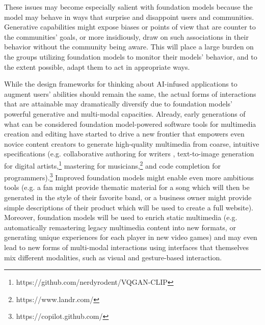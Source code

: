 These issues may become especially salient with foundation models because the model may behave in ways that surprise and disappoint users and communities. Generative capabilities might expose biases or points of view that are counter to the communities' goals, or more insidiously, draw on such associations in their behavior without the community being aware. This will place a large burden on the groups utilizing foundation models to monitor their models' behavior, and to the extent possible, adapt them to act in appropriate ways.

While the design frameworks for thinking about AI-infused applications to augment users' abilities should remain the same, the actual forms of interactions that are attainable may dramatically diversify due to foundation models' powerful generative and multi-modal capacities. Already, early generations of what can be considered foundation model-powered software tools for multimedia creation and editing have started to drive a new frontier that empowers even novice content creators to generate high-quality multimedia from coarse, intuitive specifications (e.g. collaborative authoring for writers \cite{lee_coauthor_2022}, text-to-image generation for digital artists,\footnote{https://github.com/nerdyrodent/VQGAN-CLIP} mastering for musicians,\footnote{https://www.landr.com/} and code completion for programmers).\footnote{https://copilot.github.com/} Improved foundation models might enable even more ambitious tools (e.g. a fan might provide thematic material for a song which will then be generated in the style of their favorite band, or a business owner might provide simple descriptions of their product which will be used to create a full website). Moreover, foundation models will be used to enrich static multimedia (e.g. automatically remastering legacy multimedia content into new formats, or generating unique experiences for each player in new video games) and may even lead to new forms of multi-modal interactions using interfaces that themselves mix different modalities, such as visual and gesture-based interaction. 


